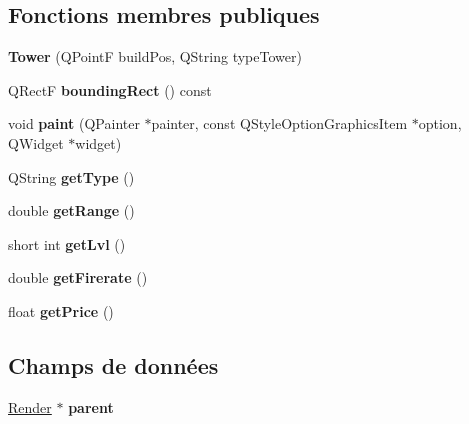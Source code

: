 \subsection*{Fonctions membres publiques}
\begin{DoxyCompactItemize}
\item 
\hypertarget{classTower_a7f9ceffca6b5ac42bd49619175cd5a22}{
{\bfseries Tower} (QPointF buildPos, QString typeTower)}
\label{classTower_a7f9ceffca6b5ac42bd49619175cd5a22}

\item 
\hypertarget{classTower_a8fc14fa547a388fa8500f39551019d87}{
QRectF {\bfseries boundingRect} () const }
\label{classTower_a8fc14fa547a388fa8500f39551019d87}

\item 
\hypertarget{classTower_ad0804070755704b426ef9edaadc58e46}{
void {\bfseries paint} (QPainter $\ast$painter, const QStyleOptionGraphicsItem $\ast$option, QWidget $\ast$widget)}
\label{classTower_ad0804070755704b426ef9edaadc58e46}

\item 
\hypertarget{classTower_a0e330af9db954014fc40c2b5533095a1}{
QString {\bfseries getType} ()}
\label{classTower_a0e330af9db954014fc40c2b5533095a1}

\item 
\hypertarget{classTower_ad56d1012706fe2b0d189bc5b3c0bdaad}{
double {\bfseries getRange} ()}
\label{classTower_ad56d1012706fe2b0d189bc5b3c0bdaad}

\item 
\hypertarget{classTower_afefd70c063a5e89d2490c3b4824d9684}{
short int {\bfseries getLvl} ()}
\label{classTower_afefd70c063a5e89d2490c3b4824d9684}

\item 
\hypertarget{classTower_abee41b219b8d886e34e4a7c9087d80fc}{
double {\bfseries getFirerate} ()}
\label{classTower_abee41b219b8d886e34e4a7c9087d80fc}

\item 
\hypertarget{classTower_a604ad233aaa46b85c8dfddc142154697}{
float {\bfseries getPrice} ()}
\label{classTower_a604ad233aaa46b85c8dfddc142154697}

\end{DoxyCompactItemize}
\subsection*{Champs de données}
\begin{DoxyCompactItemize}
\item 
\hypertarget{classTower_af840ab6d1ec47afde8beca150ee5ef60}{
\hyperlink{classRender}{Render} $\ast$ {\bfseries parent}}
\label{classTower_af840ab6d1ec47afde8beca150ee5ef60}

\end{DoxyCompactItemize}
